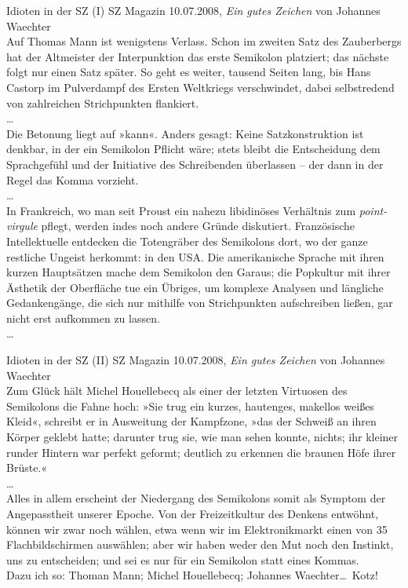 \begin{frame}
  {Idioten in der SZ (I)}
  \footnotesize
  SZ Magazin 10.07.2008, \textit{Ein gutes Zeichen} von Johannes Waechter\\
  \Zeile
  Auf Thomas Mann ist wenigstens Verlass. Schon im zweiten Satz des Zauberbergs hat der Altmeister der Interpunktion das erste Semikolon platziert; das nächste folgt nur einen Satz später. So geht es weiter, tausend Seiten lang, bis Hans Castorp im Pulverdampf des Ersten Weltkriegs verschwindet, dabei selbstredend von zahlreichen Strichpunkten flankiert.\\
  \ldots\\
  Die Betonung liegt auf »kann«. Anders gesagt: Keine Satzkonstruktion ist denkbar, in der ein Semikolon Pflicht wäre; stets bleibt die Entscheidung dem Sprachgefühl und der Initiative des Schreibenden überlassen – der dann in der Regel das Komma vorzieht.\\
  \ldots\\
  In Frankreich, wo man seit Proust ein nahezu libidinöses Verhältnis zum \textit{point-virgule} pflegt, werden indes noch andere Gründe diskutiert. Französische Intellektuelle entdecken die Totengräber des Semikolons dort, wo der ganze restliche Ungeist herkommt: in den USA. Die amerikanische Sprache mit ihren kurzen Hauptsätzen mache dem Semikolon den Garaus; die Popkultur mit ihrer Ästhetik der Oberfläche tue ein Übriges, um komplexe Analysen und längliche Gedankengänge, die sich nur mithilfe von Strichpunkten aufschreiben ließen, gar nicht erst aufkommen zu lassen.\\
  \ldots\\
\end{frame}

\begin{frame}
  {Idioten in der SZ (II)}
  \footnotesize
  SZ Magazin 10.07.2008, \textit{Ein gutes Zeichen} von Johannes Waechter\\
  \Zeile
  Zum Glück hält Michel Houellebecq als einer der letzten Virtuosen des Semikolons die Fahne hoch: »Sie trug ein kurzes, hautenges, makellos weißes Kleid«, schreibt er in Ausweitung der Kampfzone, »das der Schweiß an ihren Körper geklebt hatte; darunter trug sie, wie man sehen konnte, nichts; ihr kleiner runder Hintern war perfekt geformt; deutlich zu erkennen die braunen Höfe ihrer Brüste.«\\
  \ldots\\
  Alles in allem erscheint der Niedergang des Semikolons somit als Symptom der Angepasstheit unserer Epoche. Von der Freizeitkultur des Denkens entwöhnt, können wir zwar noch wählen, etwa wenn wir im Elektronikmarkt einen von 35 Flachbildschirmen auswählen; aber wir haben weder den Mut noch den Instinkt, uns zu entscheiden; und sei es nur für ein Semikolon statt eines Kommas.\\
  \Zeile
  \onslide<+->
  \onslide<+->
  Dazu ich so: \alert{Thoman Mann; Michel Houellebecq; Johannes Waechter\ldots\ Kotz!}
\end{frame}


